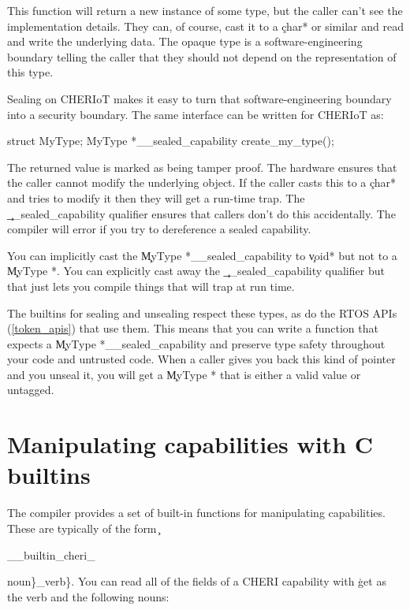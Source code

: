 {{{{{{This function will return a new instance of some type, but the caller can't see the implementation details.
They can, of course, cast it to a \c{char*} or similar and read and write the underlying data.
The opaque type is a software-engineering boundary telling the caller that they should not depend on the representation of this type.

Sealing on CHERIoT makes it easy to turn that software-engineering boundary into a security boundary.
The same interface can be written for CHERIoT as:

\begin{cxxsnippet}
struct MyType;
MyType *__sealed_capability create_my_type();
\end{cxxsnippet}

The returned value is marked as being tamper proof.
The hardware ensures that the caller cannot modify the underlying object.
If the caller casts this to a \c{char*} and tries to modify it then they will get a run-time trap.
The \c{__sealed_capability} qualifier ensures that callers don't do this accidentally.
The compiler will error if you try to dereference a sealed capability.

You can implicitly cast the \c{MyType *__sealed_capability} to \c{void*} but not to a \c{MyType *}.
You can explicitly cast away the \c{__sealed_capability} qualifier but that just lets you compile things that will trap at run time.

The builtins for sealing and unsealing respect these types, as do the RTOS APIs (\ref{token_apis}) that use them.
This means that you can write a function that expects a \c{MyType *__sealed_capability} and preserve type safety throughout your code and untrusted code.
When a caller gives you back this kind of pointer and you unseal it, you will get a \c{MyType *} that is either a valid value or untagged.

\section{Manipulating capabilities with C builtins}

The compiler provides a set of built-in functions for manipulating capabilities.
These are typically of the form \c{__builtin_cheri_{noun\}_{verb\}}.
You can read all of the fields of a CHERI capability with \c{get} as the verb and the following nouns:

}}}}}}}}
